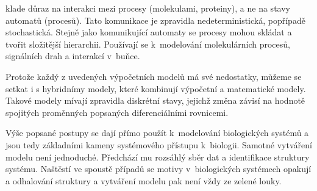 \documentclass[a4paper]{article}
\begin{document}
klade důraz na interakci mezi procesy (molekulami, proteiny), a ne na stavy automatů (procesů).
Tato komunikace je zpravidla nedeterministická, popřípadě stochastická. Stejně jako komunikující automaty
se procesy mohou skládat a tvořit složitější hierarchii. Používají se k~modelování molekulárních
procesů, signálních drah a interakcí v~buňce\cite{Fisher}.
\par
Protože každý z uvedených výpočetních modelů má své nedostatky, můžeme se setkat i s hybridnímy modely,
které kombinují výpočetní a matematické modely. Takové modely mívají zpravidla
diskrétní stavy, jejichž změna závisí na hodnotě spojitých proměnných popsaných diferenciálními rovnicemi\cite{Fisher}.
\par
Výše popsané postupy se dají přímo použít k~modelování biologických systémů a jsou tedy
základními kameny systémového přístupu k~biologii. Samotné vytváření modelu není jednoduché.
Předchází mu rozsáhlý sběr dat a identifikace struktury systému.
Naštěstí ve spoustě případů se motivy v~biologických systémech opakují\cite{Alon}
a odhalování struktury a vytváření modelu pak není vždy ze zelené louky.



\end{document}
